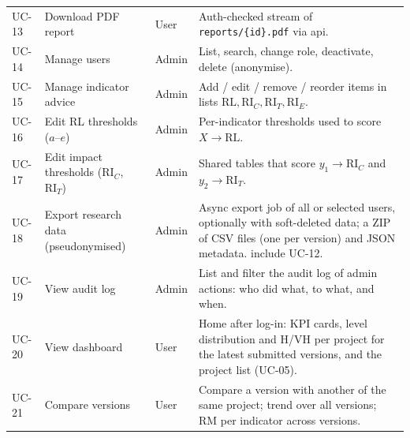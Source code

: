 \documentclass[11pt,a4paper]{article}
\newcommand{\RL}{\mathrm{RL}}
\newcommand{\RIC}{\mathrm{RI}_{C}}
\newcommand{\RIT}{\mathrm{RI}_{T}}
\newcommand{\RIE}{\mathrm{RI}_{E}}
\newcommand{\inc}{\guillemotleft include\guillemotright}
\begin{document}
\begin{longtable}{@{}l R{4.2cm} l R{7.0cm}@{}}
UC-13 & Download PDF report & User & Auth-checked stream of \texttt{reports/\{id\}.pdf} via api. \\
UC-14 & Manage users & Admin & List, search, change role, deactivate, delete (anonymise). \\
UC-15 & Manage indicator advice & Admin & Add / edit / remove / reorder items in lists $\RL,\RIC,\RIT,\RIE$. \\
UC-16 & Edit RL thresholds ($a$--$e$) & Admin & Per-indicator thresholds used to score $X \to \RL$. \\
UC-17 & Edit impact thresholds ($\RIC$, $\RIT$) & Admin & Shared tables that score $y_1 \to \RIC$ and $y_2 \to \RIT$. \\
UC-18 & Export research data (pseudonymised) & Admin & Async export job of all or selected users, optionally with soft-deleted data; a ZIP of CSV files (one per version) and JSON metadata. \inc{} UC-12. \\
UC-19 & View audit log & Admin & List and filter the audit log of admin actions: who did what, to what, and when. \\
UC-20 & View dashboard & User & Home after log-in: KPI cards, level distribution and H/VH per project for the latest submitted versions, and the project list (UC-05). \\
UC-21 & Compare versions & User & Compare a version with another of the same project; trend over all versions; RM per indicator across versions. \\
\bottomrule
\end{longtable}
\endgroup
\end{document}

